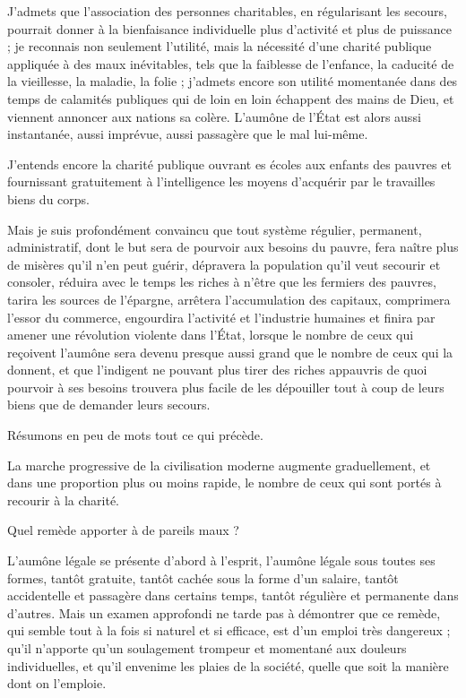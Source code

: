 \documentclass[french,twoside]{book} %
\begin{document}
J'admets que l’association des personnes charitables, en régularisant les secours, pourrait donner à la bienfaisance individuelle plus d’activité et plus de puissance ; je reconnais non seulement l’utilité, mais la nécessité d’une charité publique appliquée à des maux inévitables, tels que la faiblesse de l’enfance, la caducité de la vieillesse, la maladie, la folie ; j’admets encore son utilité momentanée dans des temps de calamités publiques qui de loin en loin échappent des mains de Dieu, et viennent annoncer aux nations sa colère. L'aumône de l’État est alors aussi instantanée, aussi imprévue, aussi passagère que le mal lui-même.\par
J'entends encore la charité publique ouvrant es écoles aux enfants des pauvres et fournissant gratuitement à l’intelligence les moyens d’acquérir par le travailles biens du corps.\par
Mais je suis profondément convaincu que tout système régulier, permanent, administratif, dont le but sera de pourvoir aux besoins du pauvre, fera naître plus de misères qu’il n’en peut guérir, dépravera la population qu’il veut secourir et consoler, réduira avec le temps les riches à n’être que les fermiers des pauvres, tarira les sources de l’épargne, arrêtera l’accumulation des capitaux, comprimera l’essor du commerce, engourdira l’activité et l’industrie humaines et finira par amener une révolution violente dans l’État, lorsque le nombre de ceux qui reçoivent l’aumône sera devenu presque aussi grand que le nombre de ceux qui la donnent, et que l’indigent ne pouvant plus tirer des riches appauvris de quoi pourvoir à ses besoins trouvera plus facile de les dépouiller tout à coup de leurs biens que de demander leurs secours.\par
Résumons en peu de mots tout ce qui précède.\par
La marche progressive de la civilisation moderne augmente graduellement, et dans une proportion plus ou moins rapide, le nombre de ceux qui sont portés à recourir à la charité.\par
Quel remède apporter à de pareils maux ?\par
L'aumône légale se présente d’abord à l’esprit, l’aumône légale sous toutes ses formes, tantôt gratuite, tantôt cachée sous la forme d’un salaire, tantôt accidentelle et passagère dans certains temps, tantôt régulière et permanente dans d’autres. Mais un examen approfondi ne tarde pas à démontrer que ce remède, qui semble tout à la fois si naturel et si efficace, est d’un emploi très dangereux ; qu’il n’apporte qu’un soulagement trompeur et momentané aux douleurs individuelles, et qu’il envenime les plaies de la société, quelle que soit la manière dont on l’emploie.\par
\end{document}
